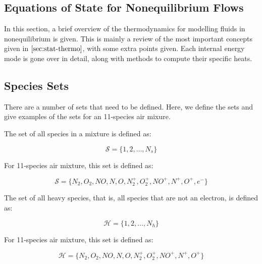 \documentclass[10pt]{article}
\begin{document}
\begin{flushleft}
\newpage 
\section{Equations of State for Nonequilibrium Flows}

In this section, a brief overview of the thermodynamics for modelling fluids in nonequilibrium is given. This is mainly a review of the most important concepts given in $\ref{sec:stat-thermo}$, with some extra points given. Each internal energy mode is gone over in detail, along with methods to compute their specific heats.

\subsection{Species Sets}

There are a number of sets that need to be defined. Here, we define the sets and give examples of the sets for an 11-species air mixure.

\begin{definition}
    \label{def:species-set}
    The set of all species in a mixture is defined as:

    \begin{equation}
        \mathcal{S} = \{ 1, 2, \dots, N_s \}
    \end{equation}

    For 11-species air mixture, this set is defined as:

    \begin{equation*}
        \mathcal{S} = \{ N_2, O_2, NO, N, O, N_2^+, O_2^+, NO^+, N^+, O^+, e^- \}
    \end{equation*}
\end{definition}

\begin{definition}
    \label{def:heavies-set}
    The set of all heavy species, that is, all species that are not an electron, is defined as:

    \begin{equation}
        \mathcal{H} = \{ 1, 2, \dots, N_h \}
    \end{equation}

    For 11-species air mixture, this set is defined as:

    \begin{equation*}
        \mathcal{H} = \{ N_2, O_2, NO, N, O, N_2^+, O_2^+, NO^+, N^+, O^+ \}
    \end{equation*}
\end{definition}


\end{flushleft}
\end{document}
